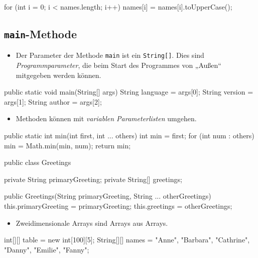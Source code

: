 \documentclass[a4paper,10pt, dvipsnames]{report}
\begin{document}
\begin{javacodebox}
for (int i = 0; i < names.length; i++) {
	names[i] = names[i].toUpperCase();
}
\end{javacodebox}

\subsection{\texttt{main}-Methode}

\begin{itemize}
	\item Der Parameter der Methode \texttt{main} ist ein \texttt{String[]}. Dies sind \textit{Programmparameter}, die beim Start des Programmes von „Außen“ mitgegeben werden können.
\end{itemize}

\begin{javacodebox}
public static void main(String[] args) {
	String language = args[0];
	String version = args[1];
	String author = args[2];
}
\end{javacodebox}

\begin{itemize}
	\item Methoden können mit \textit{variablen Parameterlisten} umgehen.
\end{itemize}

\begin{javacodebox}
public static int min(int first, int ... others) {
	int min = first;
	for (int num : others) {
		min = Math.min(min, num);
	}
	return min;
}
\end{javacodebox}

\begin{javacodebox}
public class Greetings {
	private String primaryGreeting;
	private String[] greetings;

	public Greetings(String primaryGreeting, String ... otherGreetings) {
		this.primaryGreeting = primaryGreeting;
		this.greetings = otherGreetings;
	}
}
\end{javacodebox}

\begin{itemize}
	\item Zweidimensionale Arrays sind Arrays aus Arrays.
\end{itemize}

\begin{javacodebox}
int[][] table = new int[100][5];
String[][] names = {{"Anne", "Barbara", "Cathrine"}, {"Danny", "Emilie", "Fanny"}};
\end{javacodebox}
\end{document}
